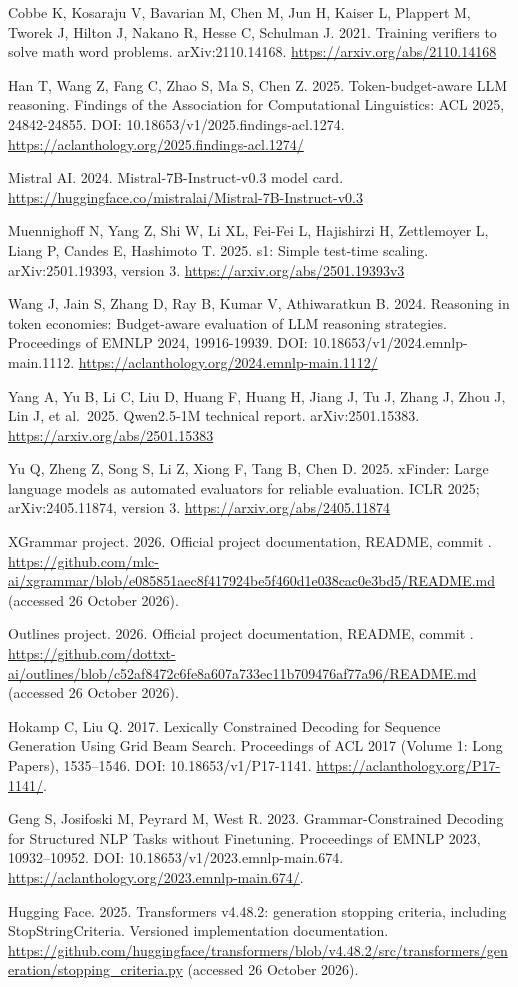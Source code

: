 \documentclass[
  12pt,
  a4paper,
]{article}
\begin{document}
Cobbe K, Kosaraju V, Bavarian M, Chen M, Jun H, Kaiser L, Plappert M,
Tworek J, Hilton J, Nakano R, Hesse C, Schulman J. 2021. Training
verifiers to solve math word problems. arXiv:2110.14168.
\url{https://arxiv.org/abs/2110.14168}

Han T, Wang Z, Fang C, Zhao S, Ma S, Chen Z. 2025. Token-budget-aware
LLM reasoning. Findings of the Association for Computational
Linguistics: ACL 2025, 24842-24855. DOI:
10.18653/v1/2025.findings-acl.1274.
\url{https://aclanthology.org/2025.findings-acl.1274/}

Mistral AI. 2024. Mistral-7B-Instruct-v0.3 model card.
\url{https://huggingface.co/mistralai/Mistral-7B-Instruct-v0.3}

Muennighoff N, Yang Z, Shi W, Li XL, Fei-Fei L, Hajishirzi H,
Zettlemoyer L, Liang P, Candes E, Hashimoto T. 2025. s1: Simple
test-time scaling. arXiv:2501.19393, version 3.
\url{https://arxiv.org/abs/2501.19393v3}

Wang J, Jain S, Zhang D, Ray B, Kumar V, Athiwaratkun B. 2024. Reasoning
in token economies: Budget-aware evaluation of LLM reasoning strategies.
Proceedings of EMNLP 2024, 19916-19939. DOI:
10.18653/v1/2024.emnlp-main.1112.
\url{https://aclanthology.org/2024.emnlp-main.1112/}

Yang A, Yu B, Li C, Liu D, Huang F, Huang H, Jiang J, Tu J, Zhang J,
Zhou J, Lin J, et al.~2025. Qwen2.5-1M technical report.
arXiv:2501.15383. \url{https://arxiv.org/abs/2501.15383}

Yu Q, Zheng Z, Song S, Li Z, Xiong F, Tang B, Chen D. 2025. xFinder:
Large language models as automated evaluators for reliable evaluation.
ICLR 2025; arXiv:2405.11874, version 3.
\url{https://arxiv.org/abs/2405.11874}

XGrammar project. 2026. Official project documentation, README, commit
\texttt{}.
\url{https://github.com/mlc-ai/xgrammar/blob/e085851aec8f417924be5f460d1e038cac0e3bd5/README.md}
(accessed 26 October 2026).

Outlines project. 2026. Official project documentation, README, commit
\texttt{}.
\url{https://github.com/dottxt-ai/outlines/blob/c52af8472c6fe8a607a733ec11b709476af77a96/README.md}
(accessed 26 October 2026).

Hokamp C, Liu Q. 2017. Lexically Constrained Decoding for Sequence
Generation Using Grid Beam Search. Proceedings of ACL 2017 (Volume 1:
Long Papers), 1535--1546. DOI: 10.18653/v1/P17-1141.
\url{https://aclanthology.org/P17-1141/}.

Geng S, Josifoski M, Peyrard M, West R. 2023. Grammar-Constrained
Decoding for Structured NLP Tasks without Finetuning. Proceedings of
EMNLP 2023, 10932--10952. DOI: 10.18653/v1/2023.emnlp-main.674.
\url{https://aclanthology.org/2023.emnlp-main.674/}.

Hugging Face. 2025. Transformers v4.48.2: generation stopping criteria,
including StopStringCriteria. Versioned implementation documentation.
\url{https://github.com/huggingface/transformers/blob/v4.48.2/src/transformers/generation/stopping_criteria.py}
(accessed 26 October 2026).
\end{document}
